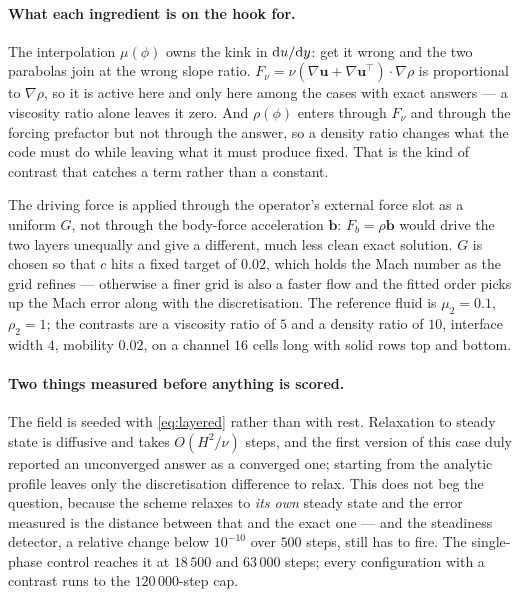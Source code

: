 \documentclass[11pt,a4paper]{article}
\newcommand{\uu}{\bm{u}}
\begin{document}
\paragraph{What each ingredient is on the hook for.} The interpolation $\mu(\phi)$
owns the kink in ${\rm d}u/{\rm d}y$: get it wrong and the two parabolas join at
the wrong slope ratio. $F_\nu = \nu(\nabla\uu+\nabla\uu^{\!\top})\!\cdot\!\nabla\rho$
is proportional to $\nabla\rho$, so it is active here and only here among the
cases with exact answers --- a viscosity ratio alone leaves it zero. And
$\rho(\phi)$ enters through $F_\nu$ and through the forcing prefactor but not
through the answer, so a density ratio changes what the code must do while
leaving what it must produce fixed. That is the kind of contrast that catches a
term rather than a constant.

The driving force is applied through the operator's external force slot as a
uniform $G$, not through the body-force acceleration $\bm{b}$: $F_b = \rho\bm{b}$
would drive the two layers unequally and give a different, much less clean exact
solution. $G$ is chosen so that $c$ hits a fixed target of $0.02$, which holds
the Mach number as the grid refines --- otherwise a finer grid is also a faster
flow and the fitted order picks up the Mach error along with the discretisation.
The reference fluid is $\mu_2=0.1$, $\rho_2=1$; the contrasts are a viscosity
ratio of $5$ and a density ratio of $10$, interface width $4$, mobility $0.02$,
on a channel $16$ cells long with solid rows top and bottom.

\paragraph{Two things measured before anything is scored.} The field is seeded
with \eqref{eq:layered} rather than with rest. Relaxation to steady state is
diffusive and takes $O(H^2/\nu)$ steps, and the first version of this case duly
reported an unconverged answer as a converged one; starting from the analytic
profile leaves only the discretisation difference to relax. This does not beg the
question, because the scheme relaxes to \emph{its own} steady state and the error
measured is the distance between that and the exact one --- and the steadiness
detector, a relative change below $10^{-10}$ over $500$ steps, still has to fire.
The single-phase control reaches it at $18\,500$ and $63\,000$ steps; every
configuration with a contrast runs to the $120\,000$-step cap.
\end{document}
